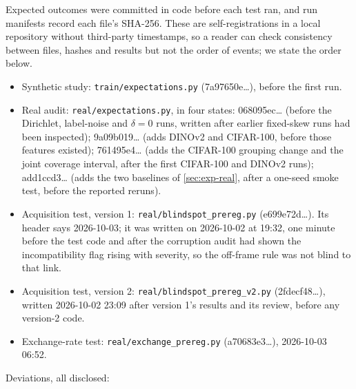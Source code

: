 \documentclass[twoside]{article}
\begin{document}
Expected outcomes were committed in code before each test ran, and run manifests record each file's
SHA-256. These are self-registrations in a local repository without third-party timestamps, so a
reader can check consistency between files, hashes and results but not the order of events; we state
the order below.
\begin{itemize}
\item Synthetic study: \texttt{train/expectations.py} (7a97650e\ldots), before the first run.
\item Real audit: \texttt{real/expectations.py}, in four states: 068095ec\ldots{} (before the
Dirichlet, label-noise and $\delta=0$ runs, written after earlier fixed-skew runs had been inspected);
9a09b019\ldots{} (adds DINOv2 and CIFAR-100, before those features existed); 761495e4\ldots{} (adds the
CIFAR-100 grouping change and the joint coverage interval, after the first CIFAR-100 and DINOv2 runs);
add1ccd3\ldots{} (adds the two baselines of \cref{sec:exp-real}, after a one-seed smoke test, before
the reported reruns).
\item Acquisition test, version 1: \texttt{real/blindspot\_prereg.py} (e699e72d\ldots). Its header
says 2026-10-03; it was written on 2026-10-02 at 19:32, one minute before the test code and after the
corruption audit had shown the incompatibility flag rising with severity, so the off-frame rule was
not blind to that link.
\item Acquisition test, version 2: \texttt{real/blindspot\_prereg\_v2.py} (2fdecf48\ldots), written
2026-10-02 23:09 after version 1's results and its review, before any version-2 code.
\item Exchange-rate test: \texttt{real/exchange\_prereg.py} (a70683e3\ldots), 2026-10-03 06:52.
\end{itemize}
Deviations, all disclosed:
\end{document}

